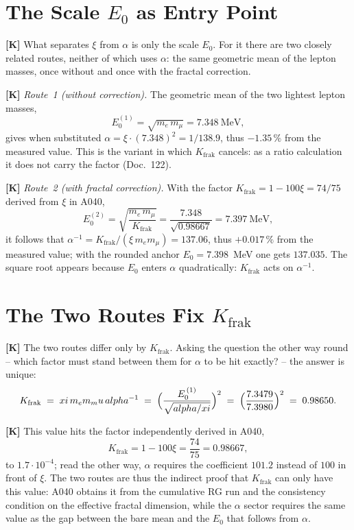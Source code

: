 \section{The Scale \texorpdfstring{$E_0$}{E0} as Entry Point}

\textbf{[K]} What separates $\xi$ from $\alpha$ is only the scale $E_0$. For it
there are two closely related routes, neither of which uses $\alpha$: the same
geometric mean of the lepton masses, once without and once with the fractal
correction.

\textbf{[K]} \emph{Route~1 (without correction).} The geometric mean of the two
lightest lepton masses,
\[
  E_0^{(1)} = \sqrt{m_e\,m_\mu} = 7{.}348\ \text{MeV},
\]
gives when substituted $\alpha = \xi\cdot(7{.}348)^2 = 1/138{.}9$, thus $-1{.}35\,\%$
from the measured value. This is the variant in which $K_\text{frak}$
cancels: as a ratio calculation it does not carry the factor (Doc.~122).

\textbf{[K]} \emph{Route~2 (with fractal correction).} With the factor
$K_\text{frak} = 1-100\xi = 74/75$ derived from $\xi$ in A040,
\[
  E_0^{(2)} = \sqrt{\frac{m_e\,m_\mu}{K_\text{frak}}}
  = \frac{7{.}348}{\sqrt{0{.}98667}} = 7{.}397\ \text{MeV},
\]
it follows that $\alpha^{-1} = K_\text{frak}/(\xi\,m_e m_\mu) = 137{.}06$, thus
$+0{.}017\,\%$ from the measured value; with the rounded anchor $E_0 = 7{.}398$~MeV
one gets $137{.}035$. The square root appears because $E_0$ enters $\alpha$
quadratically: $K_\text{frak}$ acts on $\alpha^{-1}$.

\section{The Two Routes Fix \texorpdfstring{$K_\text{frak}$}{K\_frak}}

\textbf{[K]} The two routes differ only by $K_\text{frak}$. Asking the question the
other way round -- which factor must stand between them for $\alpha$ to be hit
exactly? -- the answer is unique:
\[
  K_\text{frak} \;=\; \xi\,m_e m_\mu\,\alpha^{-1}
  \;=\; \Bigl(\frac{E_0^{\,(1)}}{\sqrt{\alpha/\xi}}\Bigr)^{2}
  \;=\; \Bigl(\frac{7{.}3479}{7{.}3980}\Bigr)^{2} \;=\; 0{.}98650 .
\]

\textbf{[K]} This value hits the factor independently derived in A040,
\[
  K_\text{frak} = 1 - 100\xi = \frac{74}{75} = 0{.}98667,
\]
to $1{.}7\cdot10^{-4}$; read the other way, $\alpha$ requires the coefficient
$101{.}2$ instead of $100$ in front of $\xi$. The two routes are thus the
indirect proof that $K_\text{frak}$ can only have this value: A040 obtains it from the cumulative RG run and the consistency
condition on the effective fractal dimension, while the $\alpha$ sector requires
the same value as the gap between the bare mean and the $E_0$ that follows from
$\alpha$.

